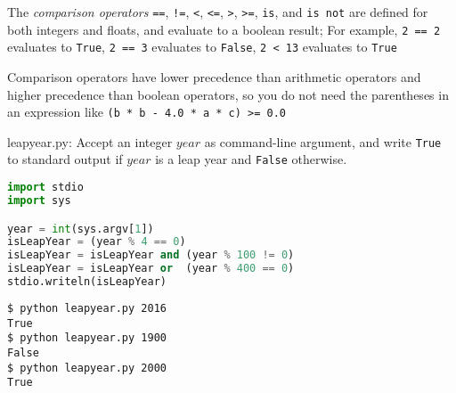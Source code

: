 \documentclass[8pt,a4paper,compress]{beamer}
\begin{document}
\begin{frame}[fragile]
\bigskip

The \emph{comparison operators} \lstinline{==}, \lstinline{!=}, \lstinline{<}, \lstinline{<=}, \lstinline{>}, \lstinline{>=}, \lstinline{is}, and \lstinline{is not} are defined for both integers and floats, and evaluate to a boolean result; For example, \lstinline{2 == 2} evaluates to \lstinline{True}, \lstinline{2 == 3} evaluates to \lstinline{False}, \lstinline{2 < 13} evaluates to \lstinline{True} 

\bigskip

Comparison operators have lower precedence than arithmetic operators and higher precedence than boolean operators, so you do not need the parentheses in an expression like \lstinline{(b * b - 4.0 * a * c) >= 0.0}
\end{frame}

\begin{frame}[fragile]
\begin{framed}
\tiny leapyear.py: Accept an integer $year$ as command-line argument, and write \lstinline{True} to standard output if $year$ is a leap year and \lstinline{False} otherwise. 
\end{framed}

\begin{lstlisting}[language=Python]
import stdio
import sys

year = int(sys.argv[1])
isLeapYear = (year % 4 == 0)
isLeapYear = isLeapYear and (year % 100 != 0)
isLeapYear = isLeapYear or  (year % 400 == 0)
stdio.writeln(isLeapYear)
\end{lstlisting}

\begin{lstlisting}[language={}]
$ python leapyear.py 2016
True
$ python leapyear.py 1900
False
$ python leapyear.py 2000
True
\end{lstlisting}
\end{frame}
\end{document}
